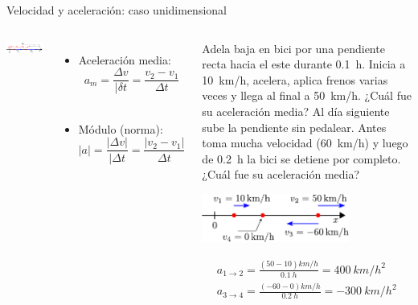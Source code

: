 \documentclass[9pt, aspectratio=169]{beamer}
\begin{document}
\begin{frame}{Velocidad y aceleración: caso unidimensional}
\begin{columns}
\cx
\begin{center}
    \includegraphics[width=1.0\textwidth]{figs/fig-06.pdf}
\end{center}
\begin{itemize}
    \item Aceleración media:
        \[ a_m = \frac{\Delta v}{|\delta t} = \frac{v_2 - v_1}{\Delta t} \] \\
        \item Módulo (norma): 
            \[ |a|  = \frac{|\Delta v|}{|\Delta t} = \frac{|v_2 - v_1|}{\Delta t} \]
    \end{itemize}
    \cx
    \begin{example}
        { \small Adela baja en bici por una pendiente recta hacia el este durante \qty{0.1}{h}. Inicia a \qty{10}{km/h}, acelera, aplica frenos varias veces y llega al final a \qty{50}{km/h}. ¿Cuál fue su aceleración media? Al día siguiente sube la pendiente sin pedalear. Antes toma mucha velocidad (\qty{60}{km/h}) y luego de \qty{0.2}{h} la bici se detiene por completo. ¿Cuál fue su aceleración media? }
        \begin{center}
            \includegraphics[width=0.7\textwidth]{figs/fig-07.pdf}
        \end{center}
        \begin{align*}
            a_{1 \rightarrow 2} = \frac{(\num{50} - \num{10})\unit{km/h}}{\qty{0.1}{h}} = \qty{400}{km/h^2} \\
            a_{3 \rightarrow 4} = \frac{(\num{-60} - \num{0}) \unit{km/h}}{\qty{0.2}{h}} = \qty{-300}{km/h^2}
        \end{align*}
    \end{example}
    \end{columns}
\end{frame}
\end{document}
